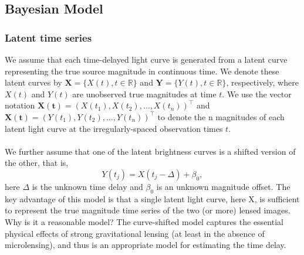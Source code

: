 \documentclass{article}
\begin{document}
\subsection*{Bayesian Model}
\subsubsection*{Latent time series}
We assume that each time-delayed light curve
is generated from a latent curve representing the true source magnitude in
continuous time. We denote these latent curves by $\mathbf{X} = \{X(t), t \in \mathbb{R}\}$
and $\mathbf{Y} = \{Y (t), t \in \mathbb{R}\}$, respectively, where $X(t)$ and $Y (t)$ are unobserved true magnitudes at time $t$. We use the vector notation $\mathbf{X(t)} =
(X(t_1 ), X(t_2), \ldots , X(t_n ))^\top$ and $\mathbf{X(t)} = (Y (t_1 ), Y (t_2 ), \ldots , Y (t_n ))^\top$ to denote
the n magnitudes of each latent light curve at the irregularly-spaced observation times $t$.
\paragraph{}We further assume that one of the latent brightness
curves is a shifted version of the other, that is,
\begin{equation*}
    Y(t_j)=X(t_j-\Delta)+\beta_0,
\end{equation*}
here $\Delta$ is the unknown time delay and $\beta_0$ is an unknown magnitude offset. The key
advantage of this model is that a single latent light curve, here X, is sufficient
to represent the true magnitude time series of the two (or more) lensed
images. Why is it a reasonable model? The curve-shifted model captures
the essential physical effects of strong gravitational lensing (at least in the
absence of microlensing), and thus is an appropriate model for estimating
the time delay.
\end{document}
